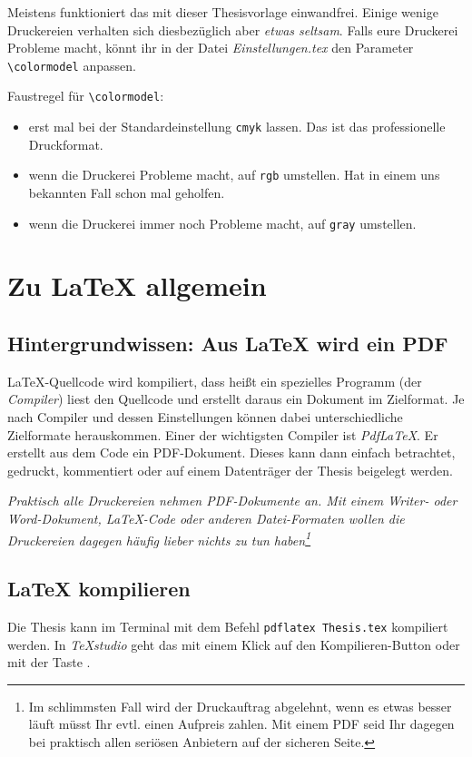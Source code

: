 			Meistens funktioniert das mit dieser Thesisvorlage einwandfrei.
			Einige wenige Druckereien verhalten sich diesbezüglich aber \emph{etwas seltsam}.
			Falls eure Druckerei Probleme macht, könnt ihr in der Datei \emph{Einstellungen.tex} den Parameter \lstinline|\colormodel| anpassen.
			
			Faustregel für \lstinline|\colormodel|:
			\begin{itemize}
			\item erst mal bei der Standardeinstellung \lstinline|cmyk| lassen. Das ist das professionelle Druckformat.
			\item wenn die Druckerei Probleme macht, auf \lstinline|rgb| umstellen. Hat in einem uns bekannten Fall schon mal geholfen.
			\item wenn die Druckerei immer noch Probleme macht, auf \lstinline|gray| umstellen.
			\end{itemize}

	\clearpage
	\section{Zu \LaTeX{} allgemein}\label{FAQ:LaTeX}
		\subsection{Hintergrundwissen: Aus \LaTeX{} wird ein PDF}
			\LaTeX-Quellcode wird kompiliert, dass heißt ein spezielles Programm (der \emph{Compiler}) liest den Quellcode und erstellt daraus ein Dokument im Zielformat.
			Je nach Compiler und dessen Einstellungen können dabei unterschiedliche Zielformate herauskommen.
%			
			Einer der wichtigsten Compiler ist \emph{Pdf\LaTeX}. Er erstellt aus dem Code ein PDF-Dokument. Dieses kann dann einfach betrachtet, gedruckt, kommentiert oder auf einem Datenträger der Thesis beigelegt werden.
			
			\emph{Praktisch alle Druckereien nehmen PDF-Dokumente an.
			Mit einem Writer- oder Word-Dokument, LaTeX-Code oder anderen Datei-Formaten wollen die Druckereien dagegen häufig lieber nichts zu tun haben\footnote{Im schlimmsten Fall wird der Druckauftrag abgelehnt, wenn es etwas besser läuft müsst Ihr evtl. einen Aufpreis zahlen. Mit einem PDF seid Ihr dagegen bei praktisch allen seriösen Anbietern auf der sicheren Seite.}}
			
		\subsection{\LaTeX{} kompilieren}
			Die Thesis kann im Terminal mit dem Befehl \lstinline|pdflatex Thesis.tex| kompiliert werden.
			In \emph{TeXstudio} geht das mit einem Klick auf den Kompilieren-Button oder mit der Taste .
			
